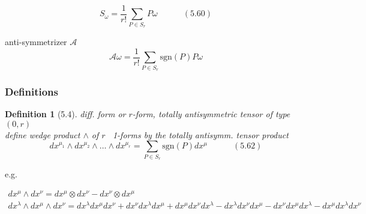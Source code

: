 \documentclass[twoside]{amsart}
\newtheorem{definition}{Definition}
\begin{document}
\[
S_{\omega} = \frac{1}{r!} \sum_{P \in S_r} P\omega \quad \quad \quad (5.60)
\]

anti-symmetrizer $\mathcal{A}$
\[
\mathcal{A} \omega = \frac{1}{r!} \sum_{ P \in S_r} \text{sgn}{(P)} P\omega
\]




\subsubsection{ Definitions}

\begin{definition}[5.4] diff. form or $r$-form, totally antisymmetric tensor of type $(0,r)$ \\
define wedge product $\wedge$ of $r$ \, 1-forms by the totally antisymm. tensor product
\begin{equation}
dx^{\mu_1} \wedge dx^{\mu_2} \wedge \dots \wedge dx^{\mu_r} = \sum_{P\in S_r} \text{sgn}{(P)} dx^{\mu} \quad \quad \quad (5.62) 
\end{equation}
\end{definition}











e.g.

\[
\begin{gathered}
  dx^{\mu} \wedge dx^{\nu} = dx^{\mu} \otimes dx^{\nu} - dx^{\nu} \otimes dx^{\mu} \\ 
  dx^{\lambda} \wedge dx^{\mu} \wedge dx^{\nu} = dx^{\lambda} dx^{\mu} dx^{\nu} + dx^{\nu} dx^{\lambda} dx^{\mu} + dx^{\mu} dx^{\nu} dx^{\lambda} - dx^{\lambda} dx^{\nu} dx^{\mu} - dx^{\nu} dx^{\mu} dx^{\lambda} - dx^{\mu} dx^{\lambda} dx^{\nu}
\end{gathered}
\]
\end{document}
